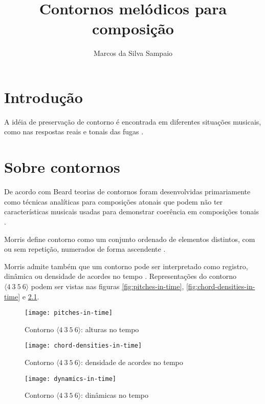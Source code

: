 \documentclass[12pt,brazil]{book}
\title{Contornos melódicos para composição}
\author{Marcos da Silva Sampaio}
\newcommand{\contorno}[1]{$\langle #1 \rangle$}
\begin{document}
\maketitle
\tableofcontents
\listoftables
\listoffigures
\graphicspath{{figs-out/}}

\chapter{Introdução}
\label{cha:introducao}

A idéia de preservação de contorno é encontrada em diferentes
situações musicais, como nas respostas reais e tonais das fugas
\cite[p. 29]{morris87:composition}.
\chapter{Sobre contornos}
\label{cha:sobre-contornos}



De acordo com Beard teorias de contornos foram desenvolvidas
primariamente como técnicas analíticas para composições atonais que
podem não ter características musicais usadas para demonstrar
coerência em composições tonais \cite[p. 1]{beard03:contour}.

Morris define contorno como um conjunto ordenado de elementos
distintos, com ou sem repetição, numerados de forma ascendente
\cite[p. 206]{morris93:directions}.

Morris admite também que um contorno pode ser interpretado como
registro, dinâmica ou densidade de acordes no tempo
\cite[p. 206]{morris93:directions}. Representações do contorno
\contorno{4\:3\:5\:6} podem ser vistas nas figuras
\ref{fig:pitches-in-time}, \ref{fig:chord-densities-in-time} e
\ref{fig:dynamics-in-time}.

\begin{figure}
\begin{minipage}{5.2cm}
  \centering
  \texttt{[image: pitches-in-time]}
  \caption{Contorno \contorno{4\:3\:5\:6}: alturas no tempo}
  \label{fig:pitches-in-time}
\end{minipage}
\begin{minipage}{5.2cm}
  \centering
  \texttt{[image: chord-densities-in-time]}
  \caption{Contorno \contorno{4\:3\:5\:6}: densidade de acordes no
    tempo}
\label{fig:chord-densities-in-time}
\end{minipage}
\begin{minipage}{5.2cm}
  \centering
  \texttt{[image: dynamics-in-time]}
  \caption{Contorno \contorno{4\:3\:5\:6}: dinâmicas no tempo}
\label{fig:dynamics-in-time}
\end{minipage}
\end{figure}
\end{document}
